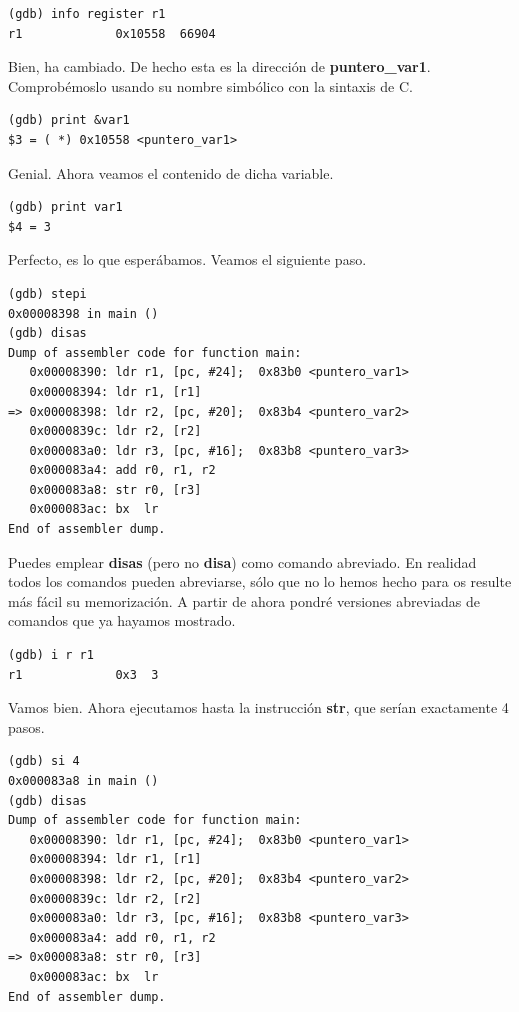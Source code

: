 \begin{lstlisting}
(gdb) info register r1
r1             0x10558  66904
\end{lstlisting}

Bien, ha cambiado. De hecho esta es la dirección de {\bf puntero\_var1}.
Comprobémoslo usando su nombre simbólico con la sintaxis de C.

\begin{lstlisting}
(gdb) print &var1
$3 = ( *) 0x10558 <puntero_var1>
\end{lstlisting}

Genial. Ahora veamos el contenido de dicha variable.

\begin{lstlisting}
(gdb) print var1
$4 = 3
\end{lstlisting}

Perfecto, es lo que esperábamos. Veamos el siguiente paso.

\begin{lstlisting}
(gdb) stepi
0x00008398 in main ()
(gdb) disas
Dump of assembler code for function main:
   0x00008390: ldr r1, [pc, #24];  0x83b0 <puntero_var1>
   0x00008394: ldr r1, [r1]
=> 0x00008398: ldr r2, [pc, #20];  0x83b4 <puntero_var2>
   0x0000839c: ldr r2, [r2]
   0x000083a0: ldr r3, [pc, #16];  0x83b8 <puntero_var3>
   0x000083a4: add r0, r1, r2
   0x000083a8: str r0, [r3]
   0x000083ac: bx  lr
End of assembler dump.
\end{lstlisting}

Puedes emplear {\bf disas} (pero no {\bf disa}) como comando
abreviado. En realidad todos los comandos pueden abreviarse, sólo
que no lo hemos hecho para os resulte más fácil su memorización.
A partir de ahora pondré versiones abreviadas de comandos que ya
hayamos mostrado.

\begin{lstlisting}
(gdb) i r r1
r1             0x3  3
\end{lstlisting}

Vamos bien. Ahora ejecutamos hasta la instrucción {\bf str}, que
serían exactamente 4 pasos.

\begin{lstlisting}
(gdb) si 4
0x000083a8 in main ()
(gdb) disas
Dump of assembler code for function main:
   0x00008390: ldr r1, [pc, #24];  0x83b0 <puntero_var1>
   0x00008394: ldr r1, [r1]
   0x00008398: ldr r2, [pc, #20];  0x83b4 <puntero_var2>
   0x0000839c: ldr r2, [r2]
   0x000083a0: ldr r3, [pc, #16];  0x83b8 <puntero_var3>
   0x000083a4: add r0, r1, r2
=> 0x000083a8: str r0, [r3]
   0x000083ac: bx  lr
End of assembler dump.
\end{lstlisting}

